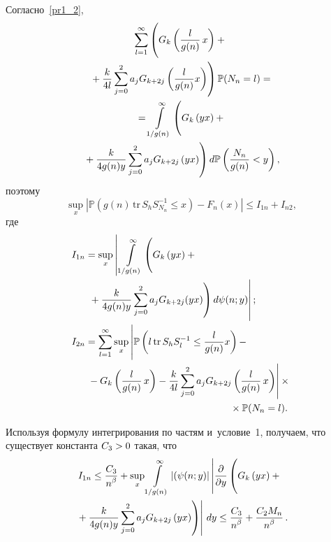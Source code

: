 \begin{multicols}{2}
Согласно~\eqref{pr1_2},
\begin{multline*}
\sum\limits_{l=1}^{\infty} \left(
\vphantom{\sum\limits_{j=0}^{2}}
 G_k\left(\fr{l}{g(n)}\,x \right) +{}\right.\\
\left.{}+ 
\fr{k}{4l}\sum\limits_{j=0}^{2}a_j G_{k+2j}\left(\fr{l}{g(n)}x \right) \right)  
\mathbb{P}(N_n=l) ={} \\
{}= \int\limits_{1/g(n)}^{\infty}\left(
\vphantom{\sum\limits_{j=0}^{2}}
 G_k\left(yx \right) + {}\right.\\
\left.{}+
\fr{k}{4g(n)y}\sum\limits_{j=0}^{2}a_j G_{k+2j}\left(yx \right) \right) 
d\mathbb{P}\left( \fr{N_n}{g(n)} < y \right),
\end{multline*}
поэтому
\begin{equation*}
\sup\limits_{x} \left| \mathbb{P}\left(g(n) \,\mathrm{tr} \,S_h S^{-1}_{N_n} \leq 
x\right)  - F_{n}(x) \right| \leq I_{1n} + I_{n2},
\end{equation*}
где
\begin{align*}
I_{1n}&= \sup_{x} \left| \,  \int\limits_{1/g(n)}^{\infty}\left(
\vphantom{\sum\limits_{j=0}^{2}}
 G_k\left(yx \right) + {}\right.\right.\\
&\left.\left.{}+
\fr{k}{4g(n)y}\sum\limits_{j=0}^{2}a_j G_{k+2j}(yx) 
\right)  d\psi(n; y) 
\vphantom{\int\limits_{1/g(n)}^{\infty}}
\right|;\\
I_{2n}&= \sum\limits_{l=1}^{\infty} \sup\limits_{x} \left| 
\vphantom{\sum\limits_{j=0}^{2}}
 \mathbb{P} \left( l \,\mathrm{tr} \,
S_h S^{-1}_{l} \leq \fr{l}{g(n)}x \right) -\right.{}\\
&\left.{}- G_k\left(\fr{l}{g(n)}\,x \right) 
-  \fr{k}{4l}\sum\limits_{j=0}^{2}a_j G_{k+2j}\left(\fr{l}{g(n)}\,x \right) 
\right|\times{}\\
&\hspace*{52mm}{}\times \mathbb{P}(N_n=l).
\end{align*}

Используя формулу интегрирования по частям и~условие~1, получаем, что существует 
константа $C_3\hm>0$ такая, что
\begin{multline*}
I_{1n}\leq \fr{C_3}{n^{\beta}} + \sup\limits_{x}    \int\limits_{1/g(n)}^{\infty} \left| 
(\psi(n;y)\right| \left|\fr{\partial}{\partial y} \left(
\vphantom{\sum\limits_{j=0}^{2}}
 G_k\left(yx \right) + {}\right.\right.\\
\left.\left.{}+
\fr{k}{4g(n)y}\sum\limits_{j=0}^{2}a_j G_{k+2j}\left(yx \right) \right)\right| \,dy 
\leq \fr{C_3}{n^{\beta}} + \fr{C_2 M_n}{n^{\beta}}\,.
\end{multline*}


\end{multicols}
